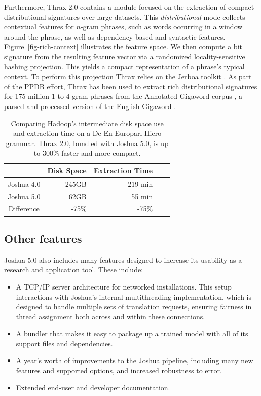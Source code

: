 \documentclass[11pt]{article}
\begin{document}
Furthermore, Thrax 2.0 contains a module focused on the extraction of
compact distributional signatures over large datasets. This
\emph{distributional} mode collects contextual features for $n$-gram
phrases, such as words occurring in a window around the phrase, as
well as dependency-based and syntactic
features. Figure~\ref{fig-rich-context} illustrates the feature
space. We then compute a bit signature from the resulting feature
vector via a randomized locality-sensitive hashing projection.  This
yields a compact representation of a phrase's typical context. To
perform this projection Thrax relies on the Jerboa toolkit
\cite{Jerboa}. As part of the PPDB effort, Thrax has been used to
extract rich distributional signatures for 175 million 1-to-4-gram
phrases from the Annotated Gigaword corpus \cite{annotated-gigaword},
a parsed and processed version of the English Gigaword
\cite{Gigaword}.

\begin{table}[t]
  \begin{center}
    \begin{tabular}{|c|r|r|r|r|}
      \hline
      & Disk Space & Extraction Time \\
      \hline
      \hline
      Joshua 4.0 & 245GB & 219 min \\
      \hline
      Joshua 5.0 & 62GB  & 55 min\\
      \hline
      \hline
      Difference & -75\% & -75\% \\
      \hline
    \end{tabular}
  \end{center}
  \caption{Comparing Hadoop's intermediate disk space use and extraction time on a
    De-En Europarl Hiero grammar. Thrax 2.0, bundled with Joshua 5.0,
    is up to 300\% faster and more compact.}
  \label{tab-thrax-speed}
\end{table}

\subsection{Other features}
\label{sec:other}

Joshua 5.0 also includes many features designed to increase its
usability as a research and application tool.  These include:

\begin{itemize}
\item A TCP/IP server architecture for networked installations.  This
  setup interactions with Joshua's internal multithreading
  implementation, which is designed to handle multiple sets of
  translation requests, ensuring fairness in thread assignment both
  across and within these connections.
\item A bundler that makes it easy to package up a trained model with
  all of its support files and dependencies.
\item A year's worth of improvements to the Joshua pipeline, including many
  new features and supported options, and increased robustness to error.
\item Extended end-user and developer documentation.
\end{itemize}
\end{document}
